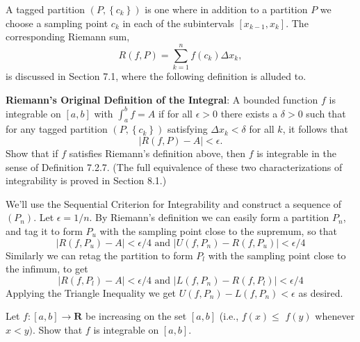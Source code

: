 \begin{exercise}
A tagged partition $\left(P,\left\{c_{k}\right\}\right)$ is one where in addition to a partition $P$ we choose a sampling point $c_{k}$ in each of the subintervals $\left[x_{k-1}, x_{k}\right]$. The corresponding Riemann sum,
$$
R(f, P)=\sum_{k=1}^{n} f\left(c_{k}\right) \Delta x_{k},
$$
is discussed in Section 7.1, where the following definition is alluded to.

{\bf Riemann's Original Definition of the Integral}: A bounded function $f$ is integrable on $[a, b]$ with $\int_{a}^{b} f=A$ if for all $\epsilon>0$ there exists a $\delta>0$ such that for any tagged partition $\left(P,\left\{c_{k}\right\}\right)$ satisfying $\Delta x_{k}<\delta$ for all $k$, it follows that
$$
|R(f, P)-A|<\epsilon .
$$
Show that if $f$ satisfies Riemann's definition above, then $f$ is integrable in the sense of Definition 7.2.7. (The full equivalence of these two characterizations of integrability is proved in Section 8.1.)
\end{exercise}
\begin{solution}
We'll use the Sequential Criterion for Integrability and construct a sequence of \((P_n)\). Let \(\epsilon = 1/n\). By Riemann's definition we can easily form a partition \(P_n\), and tag it to form \(P_u\) with the sampling point close to the supremum, so that
\[|R(f,P_u) - A| < \epsilon/4 \text{ and } |U(f,P_n) - R(f,P_u)| < \epsilon/4\]
 Similarly we can retag the partition to form \(P_l\) with the sampling point close to the infimum, to get
\[|R(f, P_l) - A| < \epsilon/4\text{ and }|L(f,P_n) - R(f, P_l)|<\epsilon/4\]
Applying the Triangle Inequality we get \(U(f,P_n) - L(f,P_n) < \epsilon\) as desired.
\end{solution}

\begin{exercise}
Let $f:[a, b] \rightarrow \mathbf{R}$ be increasing on the set $[a, b]$ (i.e., $f(x) \leq$ $f(y)$ whenever $x<y)$. Show that $f$ is integrable on $[a, b]$.
\end{exercise}
\begin{solution}
    \TODO
\end{solution}
